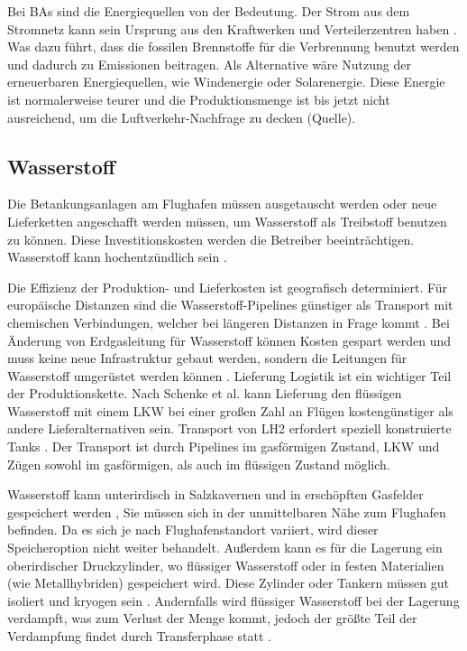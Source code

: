 Bei BAs sind die Energiequellen von der Bedeutung. 
Der Strom aus dem Stromnetz kann sein Ursprung aus den Kraftwerken und Verteilerzentren haben \cite{dalmia2022powering}. 
Was dazu führt, dass die fossilen Brennstoffe für die Verbrennung benutzt werden und dadurch zu Emissionen beitragen. 
Als Alternative wäre Nutzung der erneuerbaren Energiequellen, wie Windenergie oder Solarenergie. Diese Energie ist normalerweise teurer
und die Produktionsmenge ist bis jetzt nicht ausreichend, um die Luftverkehr-Nachfrage zu decken (Quelle).

\subsection{Wasserstoff}
%
Die Betankungsanlagen am Flughafen müssen ausgetauscht werden oder neue Lieferketten angeschafft werden müssen, 
um Wasserstoff als Treibstoff benutzen zu können.
Diese Investitionskosten werden die Betreiber beeinträchtigen. 
Wasserstoff kann hochentzündlich sein \cite{dalmia2022powering}. %

Die Effizienz der Produktion- und Lieferkosten ist geografisch determiniert. 
Für europäische Distanzen sind die Wasserstoff-Pipelines günstiger als Transport mit chemischen Verbindungen, 
welcher bei längeren Distanzen in Frage kommt \cite{undertaking2022strategic}. Bei Änderung von Erdgasleitung für Wasserstoff können Kosten gespart
werden und muss keine neue Infrastruktur gebaut werden, sondern die Leitungen für Wasserstoff umgerüstet werden können \cite{undertaking2022strategic}.
Lieferung
Logistik ist ein wichtiger Teil der Produktionskette. Nach Schenke et al. \cite{schenke2024lh2} kann Lieferung den flüssigen Wasserstoff mit einem LKW bei einer großen Zahl an Flügen 
kostengünstiger als andere Lieferalternativen sein. Transport von LH2 erfordert speziell konstruierte Tanks \cite{mulder2019outlook}.
Der Transport ist durch Pipelines im gasförmigen Zustand, LKW und Zügen sowohl im gasförmigen, als auch im flüssigen Zustand möglich. 

Wasserstoff kann unterirdisch in Salzkavernen und in erschöpften Gasfelder gespeichert werden \cite{undertaking2022strategic}, 
Sie müssen sich in der unmittelbaren Nähe zum Flughafen befinden. Da es sich je nach Flughafenstandort variiert, wird dieser Speicheroption nicht weiter behandelt.
Außerdem kann es für die Lagerung ein oberirdischer Druckzylinder, wo flüssiger Wasserstoff oder in festen Materialien (wie Metallhybriden) gespeichert wird.
Diese Zylinder oder Tankern müssen gut isoliert und kryogen sein \cite{undertaking2022strategic}.
Andernfalls wird flüssiger Wasserstoff bei der Lagerung verdampft, was zum Verlust der Menge kommt, 
jedoch der größte Teil der Verdampfung findet durch Transferphase statt \cite{undertaking2022strategic}.

